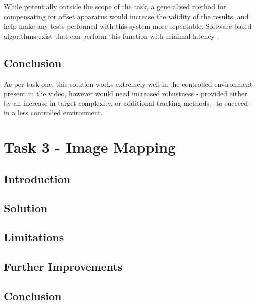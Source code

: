 \documentclass[conference]{IEEEtran}
\begin{document}
While potentially outside the scope of the task, a generalised method for compensating for offset apparatus would increase the validity of the results, and help make any tests performed with this system more repeatable. Software based algorithms exist that can perform this function with minimal latency \cite{5138693}. 
\subsection{Conclusion}
As per task one, this solution works extremely well in the controlled environment present in the video, however would need increased robustness - provided either by an increase in target complexity, or additional tracking methods - to succeed in a less controlled environment.
\section{Task 3 - Image Mapping}
\subsection{Introduction}
\subsection{Solution}
\subsection{Limitations}
\subsection{Further Improvements}
\subsection{Conclusion}


%
%
\end{document}
